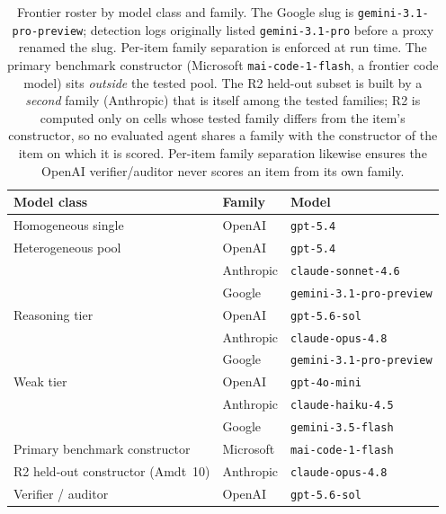 \documentclass[acmsmall,screen,nonacm]{acmart}
\begin{document}
\begin{table}[t]
\centering
\small
\caption{Frontier roster by model class and family. The Google slug is
\texttt{gemini-3.1-pro-preview}; detection logs originally listed \texttt{gemini-3.1-pro} before a proxy
renamed the slug. Per-item family
separation is enforced at run time. The primary benchmark constructor (Microsoft \texttt{mai-code-1-flash}, a
frontier code model)
sits \emph{outside} the tested pool. The R2 held-out subset is built by a \emph{second} family
(Anthropic) that is itself among the tested families; R2 is computed only on cells whose tested family
differs from the item's constructor, so no evaluated agent shares a family with the constructor of the item
on which it is scored. Per-item family separation likewise ensures the OpenAI verifier/auditor never scores
an item from its own family.}
\label{tab:roster}
\begin{tabular}{@{}lll@{}}
\toprule
Model class & Family & Model \\
\midrule
Homogeneous single & OpenAI & \texttt{gpt-5.4} \\
\addlinespace
Heterogeneous pool  & OpenAI    & \texttt{gpt-5.4} \\
                    & Anthropic & \texttt{claude-sonnet-4.6} \\
                    & Google    & \texttt{gemini-3.1-pro-preview} \\
\addlinespace
Reasoning tier      & OpenAI    & \texttt{gpt-5.6-sol} \\
                    & Anthropic & \texttt{claude-opus-4.8} \\
                    & Google    & \texttt{gemini-3.1-pro-preview} \\
\addlinespace
Weak tier           & OpenAI    & \texttt{gpt-4o-mini} \\
                    & Anthropic & \texttt{claude-haiku-4.5} \\
                    & Google    & \texttt{gemini-3.5-flash} \\
\midrule
Primary benchmark constructor & Microsoft & \texttt{mai-code-1-flash} \\
R2 held-out constructor (Amdt~10) & Anthropic & \texttt{claude-opus-4.8} \\
Verifier / auditor  & OpenAI    & \texttt{gpt-5.6-sol} \\
\bottomrule
\end{tabular}
\end{table}
\end{document}
